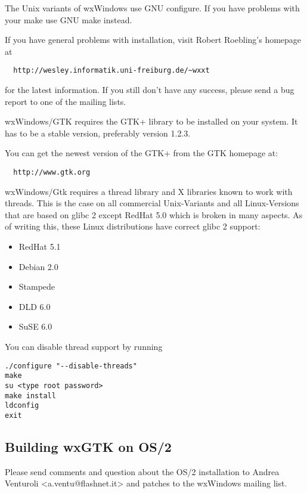 
The Unix variants of wxWindows use GNU configure. If you have problems with your 
make use GNU make instead.

If you have general problems with installation, visit Robert Roebling's homepage at 

\begin{verbatim}
  http://wesley.informatik.uni-freiburg.de/~wxxt
\end{verbatim}
  
for the latest information. If you still don't have any success, please send a bug 
report to one of the mailing lists.


wxWindows/GTK requires the GTK+ library to be installed on your system. It has to 
be a stable version, preferably version 1.2.3.

You can get the newest version of the GTK+ from the GTK homepage at:

\begin{verbatim}
  http://www.gtk.org
\end{verbatim}
  
wxWindows/Gtk requires a thread library and X libraries known to work with threads. 
This is the case on all commercial Unix-Variants and all Linux-Versions that are 
based on glibc 2 except RedHat 5.0 which is broken in many aspects. As of writing 
this, these Linux distributions have correct glibc 2 support:

\begin{itemize}\itemsep=0pt
\item RedHat 5.1
\item Debian 2.0
\item Stampede
\item DLD 6.0
\item SuSE 6.0
\end{itemize}
 
You can disable thread support by running 

\begin{verbatim}
./configure "--disable-threads"
make
su <type root password>
make install
ldconfig
exit
\end{verbatim}
  
\subsection{Building wxGTK on OS/2}

Please send comments and question about the OS/2 installation
to Andrea Venturoli <a.ventu@flashnet.it> and patches to
the wxWindows mailing list.

